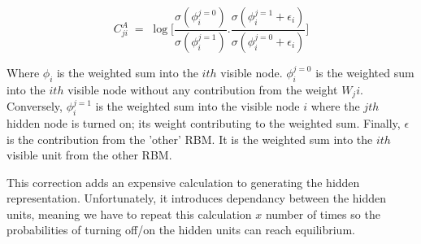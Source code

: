 $$C^A_{ji} \; = \;\log \bigg[ \frac{\sigma (\phi_i^{j=0})}{\sigma (\phi_i^{j=1})} . \frac{\sigma (\phi_i^{j=1} + \epsilon_i) }{\sigma (\phi_i^{j=0} + \epsilon_i)} \bigg] $$

Where $ \phi_i $ is the weighted sum into the $ith$ visible node. $\phi_i^{j=0} $ is the weighted sum into the $ith$ visible node without any contribution from the weight $ W_ji $. Conversely, $ \phi_i^{j=1} $ is the weighted sum into the visible node $i$ where the $jth$ hidden node is turned on; its weight contributing to the weighted sum. Finally, $ \epsilon $ is the contribution from the 'other' RBM. It is the weighted sum into the $ith$ visible unit from the other RBM. 

This correction adds an expensive calculation to generating the hidden representation. Unfortunately, it introduces dependancy between the hidden units, meaning we have to repeat this calculation $x$ number of times so the probabilities of turning off/on the hidden units can reach equilibrium.






